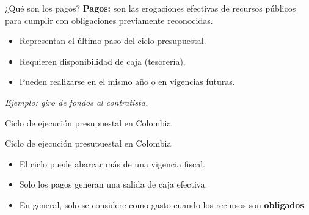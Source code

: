 \begin{frame}{¿Qué son los pagos?}
\textbf{Pagos:} son las erogaciones efectivas de recursos públicos para cumplir con obligaciones previamente reconocidas.

\vspace{1em}
\begin{itemize}
  \item Representan el último paso del ciclo presupuestal.
  \item Requieren disponibilidad de caja (tesorería).
  \item Pueden realizarse en el mismo año o en vigencias futuras.
\end{itemize}

\vspace{1em}
\textit{Ejemplo: giro de fondos al contratista.}
\end{frame}

\begin{frame}{Ciclo de ejecución presupuestal en Colombia}
\begin{center}
\end{center}
\end{frame}


\begin{frame}{Ciclo de ejecución presupuestal en Colombia}
\vspace{1em}
\begin{itemize}
  \item El ciclo puede abarcar más de una vigencia fiscal.
  \item Solo los pagos generan una salida de caja efectiva.
  \item En general, solo se considere como gasto cuando los recursos son \textbf{obligados}
\end{itemize}
\end{frame}

